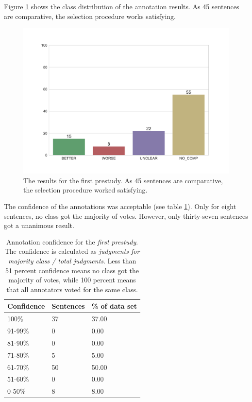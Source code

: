 Figure \ref{fig:dist_pre_a} shows the class distribution of the annotation results. As 45  sentences are comparative, the selection procedure works satisfying.

\begin{figure}[th]
\centering
\caption{The results for the first prestudy. As 45  sentences are comparative, the selection procedure worked satisfying.}
\label{fig:dist_pre_a}
\includegraphics[width=0.8\linewidth]{images/dataset/prea-dist}
\end{figure}
\FloatBarrier

The confidence of the annotations was acceptable (see table \ref{fig:pre_a_agg}). Only for eight sentences, no class got the majority of votes. However, only thirty-seven sentences got a unanimous result.

\begin{table}[tp]
\caption{Annotation confidence for the \emph{first prestudy}. The confidence is calculated as \emph{judgments for majority class / total judgments}. Less than 51 percent confidence means no class got the majority of votes, while 100 percent means that all annotators voted for the same class.}
\label{fig:pre_a_agg}
\begin{tabularx}{\textwidth}{XXX}
\toprule
Confidence & Sentences & \% of data set \\
\midrule
100\%	&	37	&	37.00	 \\ 
91-99\%	&	0	&	0.00	 \\ 
81-90\%	&	0	&	0.00	 \\ 
71-80\%	&	5	&	5.00	 \\ 
61-70\%	&	50	&	50.00	 \\ 
51-60\%	&	0	&	0.00	 \\ 
0-50\%	&	8	&	8.00	 \\ 
\bottomrule
\end{tabularx}
\end{table}

